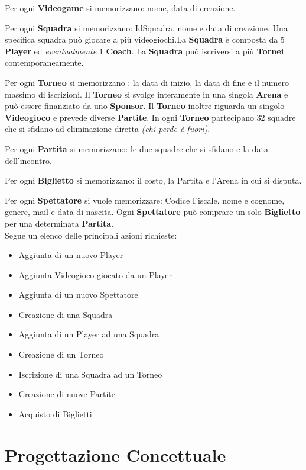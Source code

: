 \documentclass[a4paper,12pt]{report}
\begin{document}
Per ogni \textbf{Videogame} si memorizzano: nome, data di creazione.

Per ogni \textbf{Squadra} si memorizzano: IdSquadra, nome e data di creazione. Una specifica squadra può giocare a più videogiochi.La \textbf{Squadra} è composta da 5 \textbf{Player} ed \textit{eventualmente} 1 \textbf{Coach}. La \textbf{Squadra} può iscriversi a più \textbf{Tornei} contemporaneamente.

Per ogni \textbf{Torneo} si memorizzano : la data di inizio, la data di fine e il numero massimo di iscrizioni. Il \textbf{Torneo} si svolge interamente in una singola \textbf{Arena} e può essere finanziato da uno \textbf{Sponsor}. Il \textbf{Torneo} inoltre riguarda un singolo \textbf{Videogioco} e prevede diverse \textbf{Partite}. In ogni \textbf{Torneo} partecipano 32 squadre che si sfidano ad eliminazione diretta \textit{(chi perde è fuori)}.

Per ogni \textbf{Partita} si memorizzano: le due squadre che si sfidano e la data dell'incontro.

Per ogni \textbf{Biglietto} si memorizzano: il costo, la Partita e l'Arena in cui si disputa.

Per ogni \textbf{Spettatore} si vuole memorizzare: Codice Fiscale, nome e cognome, genere, mail e data di nascita. Ogni \textbf{Spettatore} può comprare un solo \textbf{Biglietto} per una determinata \textbf{Partita}.\\

Segue un elenco delle principali azioni richieste:
\begin{itemize}
	\item Aggiunta di un nuovo Player
	\item Aggiunta Videogioco giocato da un Player
	\item Aggiunta di un nuovo Spettatore
	\item Creazione di una Squadra
	\item Aggiunta di un Player ad una Squadra
	\item Creazione di un Torneo
	\item Iscrizione di una Squadra ad un Torneo
	\item Creazione di nuove Partite
	\item Acquisto di Biglietti
\end{itemize}

\chapter{Progettazione Concettuale}
\end{document}
